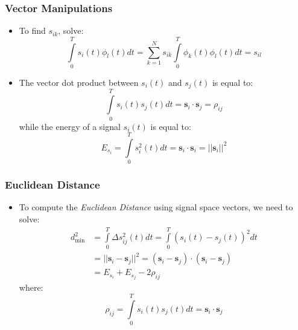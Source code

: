 \documentclass[10pt]{beamer}
\begin{document}
{
  \frametitle{Vector Manipulations}

    \begin{itemize}
        \item To find $s_{ik}$, solve:
        \begin{equation}
            \int\limits_0^Ts_i(t)\phi_l(t)dt=\sum\limits_{k=1}^{N}s_{ik}\int\limits_0^T\phi_k(t)\phi_l(t)dt=s_{il}
        \end{equation}
        \item The vector dot product between $s_i(t)$ and $s_j(t)$ is equal to:
        \begin{equation}
            \int\limits_0^Ts_i(t)s_j(t)dt=\mathbf{s}_i\cdot\mathbf{s}_j=\rho_{ij}
        \end{equation}
        while the energy of a signal $s_i(t)$ is equal to:
        \begin{equation}
            E_{s_i}=\int\limits_0^Ts_i^2(t)dt=\mathbf{s}_i\cdot\mathbf{s}_i=||\mathbf{s}_i||^2
        \end{equation}
    \end{itemize}
}
\frame
{
  \frametitle{Euclidean Distance}

    \begin{itemize}
        \item To compute the {\it Euclidean Distance} using signal space vectors, we need to solve:
        \begin{equation}
        \begin{split}
            d_{\min}^2&=\int\limits_0^T\Delta{s_{ij}^2(t)}dt=\int\limits_0^T(s_i(t)-s_j(t))^2dt\\
            &=||\mathbf{s}_i-\mathbf{s}_j||^2=(\mathbf{s}_i-\mathbf{s}_j)\cdot(\mathbf{s}_i-\mathbf{s}_j)\\
            &=E_{s_i}+E_{s_j}-2\rho_{ij}\nonumber
        \end{split}
        \end{equation}
        where:
        \begin{equation}
            \rho_{ij}=\int\limits_0^Ts_i(t)s_j(t)dt=\mathbf{s}_i\cdot\mathbf{s}_j
        \end{equation}
    \end{itemize}
}
\frame
\end{document}

